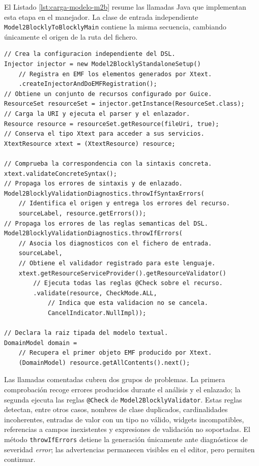 El Listado \ref{lst:carga-modelo-m2b} resume las llamadas Java que implementan
esta etapa en el manejador. La clase de entrada independiente
\texttt{Model2BlocklyToBlocklyMain} contiene la misma secuencia, cambiando
únicamente el origen de la ruta del fichero.

\begin{lstlisting}[style=tfmjava, captionpos=t, caption={Secuencia comentada de carga y validación de una entrada \texttt{.m2b}}, label={lst:carga-modelo-m2b}]
// Crea la configuracion independiente del DSL.
Injector injector = new Model2BlocklyStandaloneSetup()
    // Registra en EMF los elementos generados por Xtext.
    .createInjectorAndDoEMFRegistration();
// Obtiene un conjunto de recursos configurado por Guice.
ResourceSet resourceSet = injector.getInstance(ResourceSet.class);
// Carga la URI y ejecuta el parser y el enlazador.
Resource resource = resourceSet.getResource(fileUri, true);
// Conserva el tipo Xtext para acceder a sus servicios.
XtextResource xtext = (XtextResource) resource;

// Comprueba la correspondencia con la sintaxis concreta.
xtext.validateConcreteSyntax();
// Propaga los errores de sintaxis y de enlazado.
Model2BlocklyValidationDiagnostics.throwIfSyntaxErrors(
    // Identifica el origen y entrega los errores del recurso.
    sourceLabel, resource.getErrors());
// Propaga los errores de las reglas semanticas del DSL.
Model2BlocklyValidationDiagnostics.throwIfErrors(
    // Asocia los diagnosticos con el fichero de entrada.
    sourceLabel,
    // Obtiene el validador registrado para este lenguaje.
    xtext.getResourceServiceProvider().getResourceValidator()
        // Ejecuta todas las reglas @Check sobre el recurso.
        .validate(resource, CheckMode.ALL,
            // Indica que esta validacion no se cancela.
            CancelIndicator.NullImpl));

// Declara la raiz tipada del modelo textual.
DomainModel domain =
    // Recupera el primer objeto EMF producido por Xtext.
    (DomainModel) resource.getAllContents().next();
\end{lstlisting}

Las llamadas comentadas cubren dos grupos de problemas. La primera comprobación recoge
errores producidos durante el análisis y el enlazado; la segunda ejecuta las
reglas \texttt{@Check} de \texttt{Model2BlocklyValidator}. Estas reglas detectan,
entre otros casos, nombres de clase duplicados, cardinalidades incoherentes,
entradas de valor con un tipo no válido, widgets incompatibles, referencias a
campos inexistentes y expresiones de validación no soportadas. El método
\texttt{throwIfErrors} detiene la generación únicamente ante diagnósticos de
severidad \emph{error}; las advertencias permanecen visibles en el editor, pero
permiten continuar.

